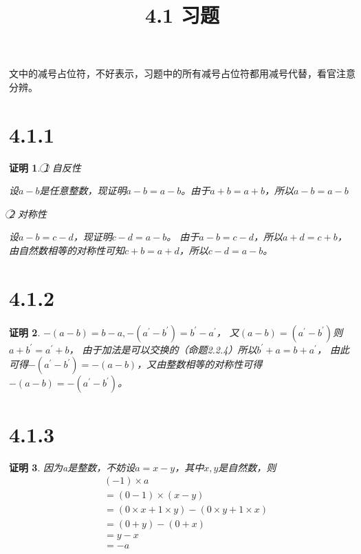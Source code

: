 \documentclass{article}
\theoremstyle{mystyle}
\theoremstyle{zproofstyle}
\newtheorem*{zproof}{证明}
\begin{document}
\title{4.1 习题}
\maketitle

文中的减号占位符，不好表示，习题中的所有减号占位符都用减号代替，看官注意分辨。

\section*{4.1.1}
\begin{zproof}
  \textcircled{1} 自反性

  设$a-b$是任意整数，现证明$a-b=a-b$。由于$a+b=a+b$，所以$a-b=a-b$

  \textcircled{2} 对称性

  设$a-b=c-d$，现证明$c-d=a-b$。
  由于$a-b=c-d$，所以$a+d=c+b$，由自然数相等的对称性可知$c+b=a+d$，所以$c-d=a-b$。
\end{zproof}

\section*{4.1.2}
\begin{zproof}
  $-(a-b)=b-a,-(a^\prime - b^\prime)=b^\prime - a^\prime$，
  又$(a-b)=(a^\prime - b^\prime)$则$a+b^\prime = a^\prime + b$，
  由于加法是可以交换的（命题2.2.4）所以$b^\prime + a = b + a^\prime$，
  由此可得$-(a^\prime - b^\prime)=-(a-b)$，又由整数相等的对称性可得$-(a-b)=-(a^\prime - b^\prime)$。
\end{zproof}

\section*{4.1.3}
\begin{zproof}
  因为a是整数，不妨设$a = x-y$，其中$x, y$是自然数，则
  \begin{align*}
     & (-1) \times a                                           \\
     & =(0-1) \times (x-y)                                     \\
     & = (0 \times x + 1 \times y) - (0 \times y + 1 \times x) \\
     & = (0 + y) - (0 + x)                                     \\
     & = y - x                                                 \\
     & = -a
  \end{align*}
\end{zproof}
\end{document}
